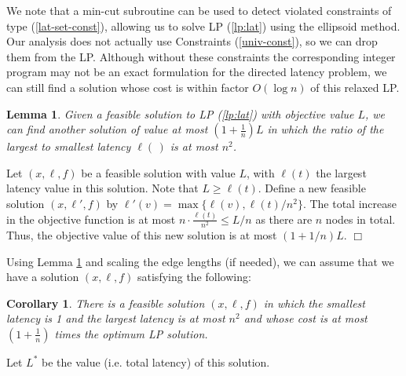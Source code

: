 \documentclass[11pt]{article}
\newcommand{\qed}{\hspace*{\fill}$\Box$}
\newtheorem{lemma}[theorem]{Lemma}
\newtheorem{corollary}[theorem]{Corollary}
\newenvironment{proof}[1][Proof. ]{\noindent {\bf #1 }}{\qed}
\begin{document}
We note 
that a min-cut subroutine can be used to detect violated constraints of type (\ref{lat-set-const}), allowing us to solve 
 LP (\ref{lp:lat}) using the ellipsoid method. 
Our analysis does not actually use 
Constraints (\ref{univ-const}), so we can drop them from the LP. Although without these
constraints the corresponding integer program may not be an exact formulation
for the directed latency problem,
we can still find a solution whose cost is within factor $O(\log n)$ of this relaxed LP.



\begin{lemma}\label{lem:scale}
Given a feasible solution to LP (\ref{lp:lat}) with objective value
$L$, we can find another solution of value at most $(1+\frac{1}{n})L$ in which the ratio of
the largest to smallest latency $\ell(\,)$ is at most $n^2$.
\end{lemma}
\begin{proof}
Let $({x},{\ell},{f})$ be a feasible solution with value $L$, with $\ell(t)$ the largest latency value in this solution. Note that $L\geq \ell(t)$.
Define a new feasible solution $({x},{\ell'},{f})$ by ${\ell'}(v)=\max\{\ell(v),\ell(t)/n^2\}$.
The total increase in the objective function is at most $n\cdot\frac{\ell(t)}{n^2}\leq L/n$ as there are $n$ nodes in total. Thus, the objective value of this new solution is at most $(1+1/n)L$.
\end{proof}

\medskip



Using Lemma \ref{lem:scale} and scaling the edge lengths (if needed), 
we can assume that we have a solution $({x},{\ell},{f})$ satisfying the following:

\begin{corollary} \label{cor:lstar}
There is a feasible solution $({x},{\ell},{f})$
in which the smallest latency is 1 and the largest latency is at most $n^2$ and whose cost is at most $(1+\frac{1}{n})$ times the optimum LP solution.
\end{corollary}

\noindent
Let $L^*$ be the value (i.e. total latency) of this solution.
\end{document}
